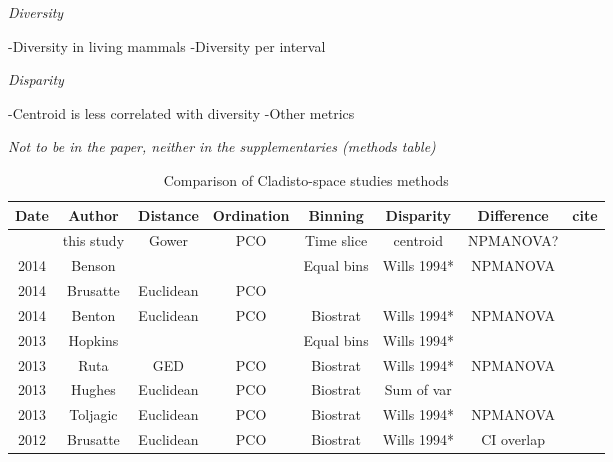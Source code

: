 \documentclass[12pt,letterpaper]{article}
\renewcommand{\subsection}[1]{%
\bigskip
\begin{center}
\begin{large}
\normalfont\itshape #1
\end{large}
\end{center}}
\begin{document}
\subsection{Diversity}
-Diversity in living mammals
-Diversity per interval

\subsection{Disparity}
-Centroid is less correlated with diversity
-Other metrics

\subsection{Not to be in the paper, neither in the supplementaries (methods table)}

\begin{table}[ht]
\caption{Comparison of Cladisto-space studies methods}
\centering
\begin{tabular}{cccccccc}
  \hline
    Date & Author      & Distance  & Ordination & Binning    & Disparity   & Difference & cite \\ %
  \hline
         & this study  & Gower     & PCO        & Time slice & centroid    & NPMANOVA?  & \\
    2014 & Benson      &           &            & Equal bins & Wills 1994* & NPMANOVA   & \citep{bensonfaunal2014} \\
    2014 & Brusatte    & Euclidean & PCO        &            &             &            & \citep{brusattegradual2014} \\
    2014 & Benton      & Euclidean & PCO        & Biostrat   & Wills 1994* & NPMANOVA   & \citep{bentonmodels2014} \\
    2013 & Hopkins     &           &            & Equal bins & Wills 1994* &            & \citep{hopkinsdecoupling2013} \\             
    2013 & Ruta        & GED       & PCO        & Biostrat   & Wills 1994* & NPMANOVA   & \citep{ruta2013} \\
    2013 & Hughes      & Euclidean & PCO        & Biostrat   & Sum of var  &            & \citep{Hughes20082013} \\
    2013 & Toljagic    & Euclidean & PCO        & Biostrat   & Wills 1994* & NPMANOVA   & \citep{toljagictriassic-jurassic2013} \\
    2012 & Brusatte    & Euclidean & PCO        & Biostrat   & Wills 1994* & CI overlap & \citep{brusattedinosaur2012} \\

\end{tabular}
\end{table}
\end{document}
